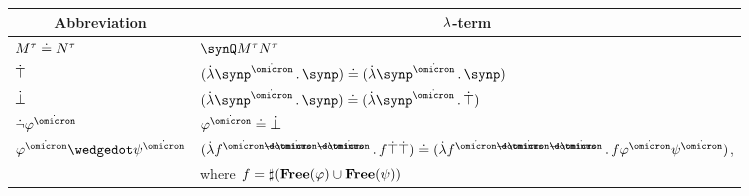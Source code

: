 \begin{definition}
  \begin{table}
    \begin{center}
      \begin{tabular}{l l}
        \toprule
        \multicolumn{1}{c}{Abbreviation}                             & \multicolumn{1}{c}{\( {\mathrm \lambda} \)-term}                                                                                                                                                                                              \\
        \midrule
        \( M^\tau \doteq N^\tau \)                                   & \( \synQ M^\tau N^\tau \)                                                                                                                                                                                                              \\
        \( \dot{\top} \)                                                & \( (\qabs {\synp^{\syn\omicron}} \synp) \syneq (\qabs {\synp^{\syn\omicron}} \synp) \)                                                                                                                                                 \\
        \( \dot{\bot} \)                                                & \( (\qabs {\synp^{\syn\omicron}} \synp) \syneq (\qabs {\synp^{\syn\omicron}} \syntop) \)                                                                                                                                               \\
        \( \synneg \varphi^{\syn\omicron} \)                         & \( \varphi^{\syn\omicron} \syneq \synbot \)                                                                                                                                                                                            \\
        \( \varphi^{\syn\omicron} \synwedge \psi^{\syn\omicron} \)   & \( (\qabs {f^{\syn\omicron \synimplies \syn\omicron \synimplies \syn\omicron}} f \syntop \syntop) \syneq (\qabs {f^{\syn\omicron \synimplies \syn\omicron \synimplies \syn\omicron}} f \varphi^{\syn\omicron} \psi^{\syn\omicron}) \), \\
                                                                     & \quad where \( f = \sharp(\op*{Free}(\varphi) \cup \op*{Free}(\psi)) \)                                                                                                                                                                \\

\end{tabular}
\end{center}
\end{table}
\end{definition}
